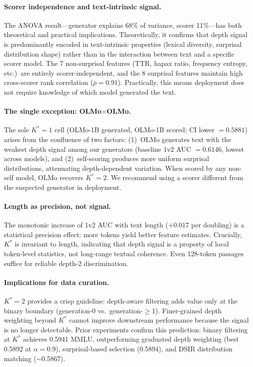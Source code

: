\documentclass[11pt]{article}
\newcommand{\Kstar}{K^{*}}
\begin{document}
\paragraph{Scorer independence and text-intrinsic signal.}
The ANOVA result---generator explains 68\% of variance, scorer 11\%---has both theoretical and practical implications.
Theoretically, it confirms that depth signal is predominantly encoded in text-intrinsic properties (lexical diversity, surprisal distribution shape) rather than in the interaction between text and a specific scorer model.
The 7 non-surprisal features (TTR, hapax ratio, frequency entropy, etc.)\ are entirely scorer-independent, and the 8 surprisal features maintain high cross-scorer rank correlation ($\bar{\rho}\!=\!0.91$).
Practically, this means deployment does not require knowledge of which model generated the text.

\paragraph{The single exception: OLMo$\times$OLMo.}
The sole $\Kstar\!=\!1$ cell (OLMo-1B generated, OLMo-1B scored; CI lower $= 0.5881$) arises from the confluence of two factors: (1)~OLMo generates text with the weakest depth signal among our generators (baseline 1v2 AUC $= 0.6146$, lowest across models), and (2)~self-scoring produces more uniform surprisal distributions, attenuating depth-dependent variation.
When scored by any non-self model, OLMo recovers $\Kstar\!=\!2$.
We recommend using a scorer different from the suspected generator in deployment.

\paragraph{Length as precision, not signal.}
The monotonic increase of 1v2 AUC with text length ($+0.017$ per doubling) is a statistical precision effect: more tokens yield better feature estimates.
Crucially, $\Kstar$ is invariant to length, indicating that depth signal is a property of local token-level statistics, not long-range textual coherence.
Even 128-token passages suffice for reliable depth-2 discrimination.

\paragraph{Implications for data curation.}
$\Kstar\!=\!2$ provides a crisp guideline: depth-aware filtering adds value only at the binary boundary (generation-0 vs.\ generation-$\geq$1).
Finer-grained depth weighting beyond $\Kstar$ cannot improve downstream performance because the signal is no longer detectable.
Prior experiments confirm this prediction: binary filtering at $\Kstar$ achieves 0.5941 MMLU, outperforming graduated depth weighting (best 0.5892 at $\alpha\!=\!0.9$), surprisal-based selection (0.5894), and DSIR distribution matching (${\sim}$0.5867).
\end{document}
